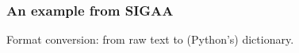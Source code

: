 \begin{frame}[fragile]
  \frametitle{An example from SIGAA}
  Format conversion: from raw text to (Python's) dictionary.
\end{frame}
